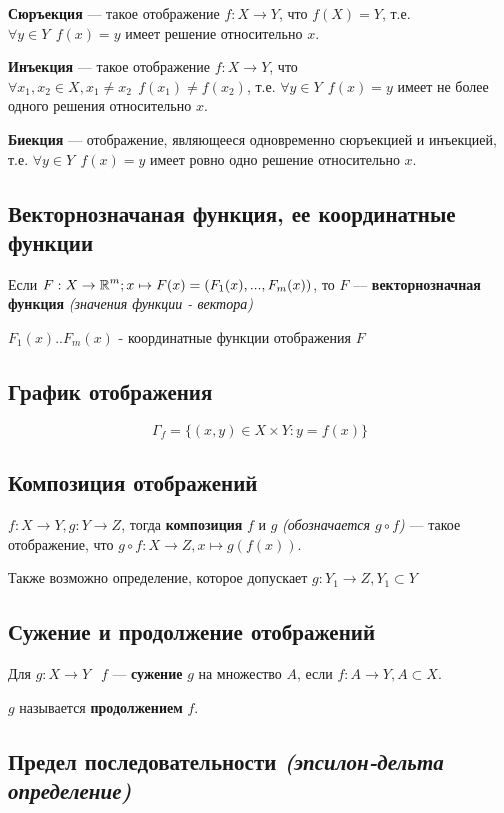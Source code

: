 \textbf{Сюръекция} --- такое отображение $f: X\to Y$, что $f(X)=Y$, т.е. $\forall y\in Y \ \ f(x)=y$ имеет решение относительно $x$.


\textbf{Инъекция} --- такое отображение $f: X\to Y$, что $\forall x_1, x_2 \in X, x_1\not=x_2 \ \ f(x_1)\not=f(x_2)$, т.е. $\forall y\in Y \ \ f(x)=y$ имеет не более одного решения относительно $x$.


\textbf{Биекция} --- отображение, являющееся одновременно сюръекцией и инъекцией, т.е. $\forall y\in Y \ \ f(x)=y$ имеет ровно одно решение относительно $x$.

\subsection{Векторнозначаная функция, ее координатные функции}

Если $F:X\to \operatorname*{\mathbb{R}}^m; x\mapsto F(x) = (F_1(x), ..., F_m(x))$, то $F$ --- \textbf{векторнозначная функция} \textit{(значения функции - вектора)}


$F_1(x)..F_m(x)$ - координатные функции отображения $F$

\subsection{График отображения}

$$\Gamma_f = \{(x,y)\in X\times Y: y = f(x) \}$$

\subsection{Композиция отображений}

$f: X\to Y, g: Y\to Z$, тогда \textbf{композиция} $f$ и $g$ \textit{(обозначается $g\circ f$)} --- такое отображение, что $g\circ f: X\to Z, x\mapsto g(f(x))$.


Также возможно определение, которое допускает $g: Y_1\to Z, Y_1\subset Y$

\subsection{Сужение и продолжение отображений}

Для $g: X\to Y\ \ $ $f$ --- \textbf{сужение} $g$ на множество $A$, если $f: A\to Y, A\subset X$.


$g$ называется \textbf{продолжением} $f$.

\subsection{Предел последовательности \textit{(эпсилон-дельта определение)}}

